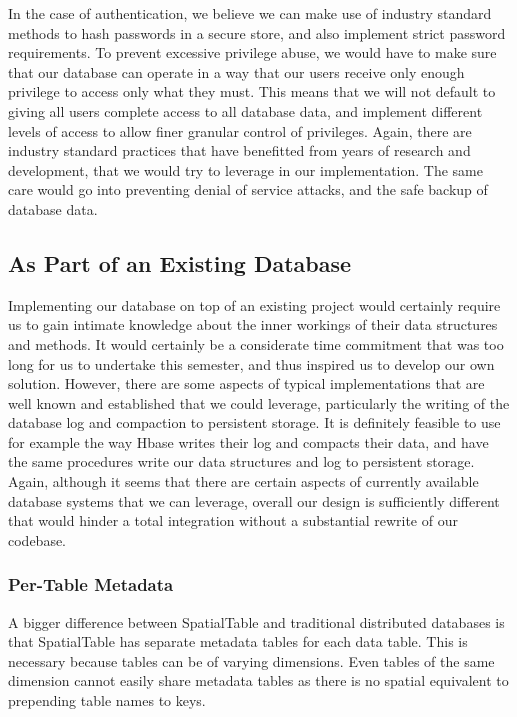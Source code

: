 \documentclass[11pt]{article}
\begin{document}
In the case of authentication, we believe we can make use of industry standard methods to hash passwords in a secure store, and also implement strict password requirements. To prevent excessive privilege abuse, we would have to make sure that our database can operate in a way that our users receive only enough privilege to access only what they must. This means that we will not default to giving all users complete access to all database data, and implement different levels of access to allow finer granular control of privileges. Again, there are industry standard practices that have benefitted from years of research and development, that we would try to leverage in our implementation. The same care would go into preventing denial of service attacks, and the safe backup of database data.

\subsection{As Part of an Existing Database}
Implementing our database on top of an existing project would certainly require us to gain intimate knowledge about the inner workings of their data structures and methods. It would certainly be a considerate time commitment that was too long for us to undertake this semester, and thus inspired us to develop our own solution. However, there are some aspects of typical implementations that are well known and established that we could leverage, particularly the writing of the database log and compaction to persistent storage. It is definitely feasible to use for example the way Hbase writes their log and compacts their data, and have the same procedures write our data structures and log to persistent storage. Again, although it seems that there are certain aspects of currently available database systems that we can leverage, overall our design is sufficiently different that would hinder a total integration without a substantial rewrite of our codebase.

\subsubsection{Per-Table Metadata}

A bigger difference between SpatialTable and traditional distributed databases is that SpatialTable has separate metadata tables for each data table.  This is necessary because tables can be of varying dimensions.  Even tables of the same dimension cannot easily share metadata tables as there is no spatial equivalent to prepending table names to keys.
\end{document}
